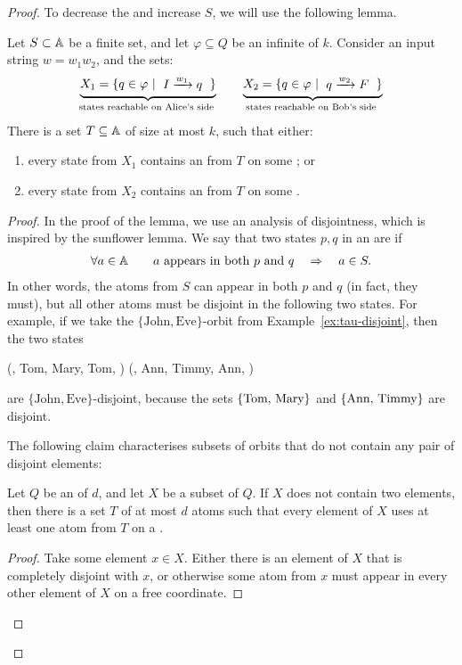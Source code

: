 \begin{proof}
To decrease the  and increase $S$, we will use the following lemma.
\begin{lemma}\label{lem:fixed-atoms}
  Let $S \subset \mathbb A$ be a finite set, and let $\varphi \subseteq Q$ be an infinite 
  of  $k$. 
  Consider an input string $w = w_1 w_2$, and the sets:
  \begin{align*}
  \myunderbrace{X_1 = \setbuild{ q \in \varphi}{$ I \xrightarrow{w_1} q$}}{states reachable on Alice's side}
  \qquad
  \myunderbrace{X_2 = \setbuild{ q \in \varphi}{$ q \xrightarrow{w_2} F$}}{states reachable on Bob's side}
  \end{align*}
  There is a set $T \subseteq \mathbb A$ of size at most $k$, such that either: 
  \begin{enumerate}
    \item   every state from $X_1$ contains an  from $T$ on some ; or 
    \item   every state from $X_2$ contains an  from $T$ on some .
  \end{enumerate}
\end{lemma}
    \begin{proof}
      \AP
 In the proof of the lemma, we use an analysis of disjointness, which is
 inspired by the sunflower lemma. We say that two states $p,q$ in an 
 are  if 
 \begin{align*}
    \forall a \in \mathbb A 
    \qquad 
 \text{$a$ appears in both $p$ and $q$} \quad \Rightarrow \quad a \in S.
 \end{align*}
 In other words, the atoms from $S$ can appear in both $p$ and $q$ (in fact, they must), but all other atoms
must be disjoint in the following two states.
 For example, if we take the $\{\textrm{John}, \textrm{Eve}\}$-orbit from Example~\ref{ex:tau-disjoint}, then the two states
\begin{center}
    (, Tom, Mary, Tom, ) \qquad
    (, Ann, Timmy, Ann, )
\end{center}
are $\{\textrm{John}, \textrm{Eve}\}$-disjoint, because the sets
$\{\text{Tom, Mary}\}$ and $\{\text{Ann, Timmy}\}$ are disjoint. 

The following claim characterises subsets of orbits that do not contain any pair of disjoint elements:
\begin{claim}\label{claim:sunflower}
  Let $Q$ be an  of  $d$, and let $X$ be a subset of $Q$.
  If $X$ does not contain two  elements, then there is a
  set $T$ of at most $d$ atoms such that every element of $X$ uses at least one atom from $T$ on a .
\end{claim}
\begin{proof}
        Take some element $x \in X$. Either there is an element of $X$ that is completely disjoint with $x$, or otherwise some atom from $x$ must appear in every other element of $X$ on a free coordinate.
\end{proof}


\end{proof}
\end{proof}

